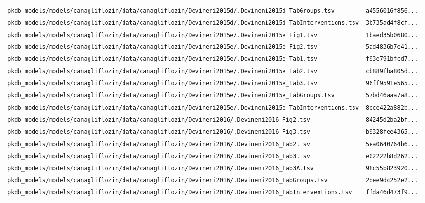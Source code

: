 \documentclass{article}
\begin{document}
\begin{longtable}{ll}
\texttt{pkdb\_models/models/canagliflozin/data/canagliflozin/Devineni2015d/.Devineni2015d\_TabGroups.tsv} & \texttt{a4556016f856...} \\
\texttt{pkdb\_models/models/canagliflozin/data/canagliflozin/Devineni2015d/.Devineni2015d\_TabInterventions.tsv} & \texttt{3b735ad4f8cf...} \\
\texttt{pkdb\_models/models/canagliflozin/data/canagliflozin/Devineni2015e/.Devineni2015e\_Fig1.tsv} & \texttt{1baed35b0680...} \\
\texttt{pkdb\_models/models/canagliflozin/data/canagliflozin/Devineni2015e/.Devineni2015e\_Fig2.tsv} & \texttt{5ad4836b7e41...} \\
\texttt{pkdb\_models/models/canagliflozin/data/canagliflozin/Devineni2015e/.Devineni2015e\_Tab1.tsv} & \texttt{f93e791bfcd7...} \\
\texttt{pkdb\_models/models/canagliflozin/data/canagliflozin/Devineni2015e/.Devineni2015e\_Tab2.tsv} & \texttt{cb889fba805d...} \\
\texttt{pkdb\_models/models/canagliflozin/data/canagliflozin/Devineni2015e/.Devineni2015e\_Tab3.tsv} & \texttt{96ff9591e565...} \\
\texttt{pkdb\_models/models/canagliflozin/data/canagliflozin/Devineni2015e/.Devineni2015e\_TabGroups.tsv} & \texttt{57bd46aaa7a8...} \\
\texttt{pkdb\_models/models/canagliflozin/data/canagliflozin/Devineni2015e/.Devineni2015e\_TabInterventions.tsv} & \texttt{8ece422a882b...} \\
\texttt{pkdb\_models/models/canagliflozin/data/canagliflozin/Devineni2016/.Devineni2016\_Fig2.tsv} & \texttt{84245d2ba2bf...} \\
\texttt{pkdb\_models/models/canagliflozin/data/canagliflozin/Devineni2016/.Devineni2016\_Fig3.tsv} & \texttt{b9328fee4365...} \\
\texttt{pkdb\_models/models/canagliflozin/data/canagliflozin/Devineni2016/.Devineni2016\_Tab2.tsv} & \texttt{5ea0640764b6...} \\
\texttt{pkdb\_models/models/canagliflozin/data/canagliflozin/Devineni2016/.Devineni2016\_Tab3.tsv} & \texttt{e02222b8d262...} \\
\texttt{pkdb\_models/models/canagliflozin/data/canagliflozin/Devineni2016/.Devineni2016\_Tab3A.tsv} & \texttt{98c55b823920...} \\
\texttt{pkdb\_models/models/canagliflozin/data/canagliflozin/Devineni2016/.Devineni2016\_TabGroups.tsv} & \texttt{2dee9dc252e2...} \\
\texttt{pkdb\_models/models/canagliflozin/data/canagliflozin/Devineni2016/.Devineni2016\_TabInterventions.tsv} & \texttt{ffda46d473f9...} \\

\end{longtable}
\end{document}
